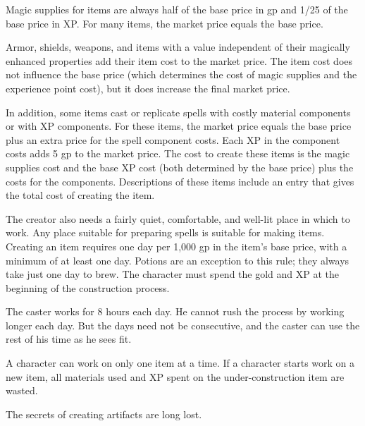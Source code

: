 \documentclass{article}
\begin{document}
Magic supplies for items are always half of the base price in gp and 1/25 of the 
base price in XP. For many items, the market price equals the base price.

Armor, shields, weapons, and items with a value independent of their magically 
enhanced properties add their item cost to the market price. The item cost does 
not influence the base price (which determines the cost of magic supplies and the 
experience point cost), but it does increase the final market price.

In addition, some items cast or replicate spells with costly material components 
or with XP components. For these items, the market price equals the base price 
plus an extra price for the spell component costs. Each XP in the component costs 
adds 5 gp to the market price. The cost to create these items is the magic supplies 
cost and the base XP cost (both determined by the base price) plus the costs for 
the components. Descriptions of these items include an entry that gives the total 
cost of creating the item.

The creator also needs a fairly quiet, comfortable, and well-lit place in which 
to work. Any place suitable for preparing spells is suitable for making items. 
Creating an item requires one day per 1,000 gp in the item's base price, with a 
minimum of at least one day. Potions are an exception to this rule; they always 
take just one day to brew. The character must spend the gold and XP at the beginning 
of the construction process.

The caster works for 8 hours each day. He cannot rush the process by working longer 
each day. But the days need not be consecutive, and the caster can use the rest 
of his time as he sees fit.

A character can work on only one item at a time. If a character starts work on 
a new item, all materials used and XP spent on the under-construction item are 
wasted.

The secrets of creating artifacts are long lost.
\end{document}
